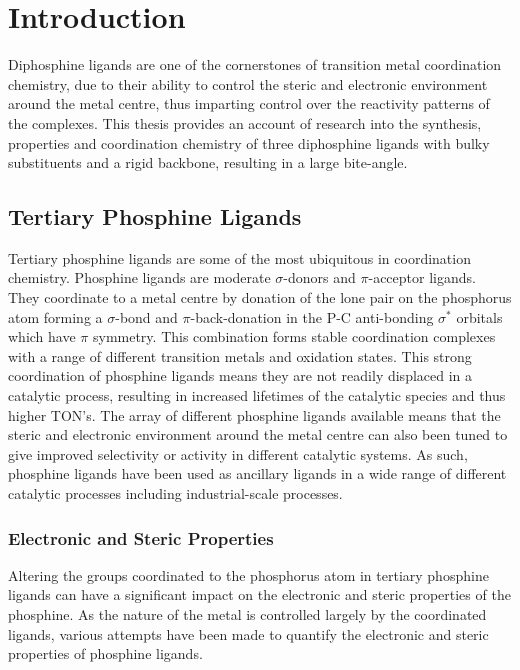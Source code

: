 
\chapter{Introduction}
\label{chapter:introduction}

Diphosphine ligands are one of the cornerstones of transition metal coordination chemistry, due to their ability to control the steric and electronic environment around the metal centre, thus imparting control over the reactivity patterns of the complexes.  This thesis provides an account of research into the synthesis, properties and coordination chemistry of three diphosphine ligands with bulky \tBu{} substituents and a rigid backbone, resulting in a large bite-angle.  

\section{Tertiary Phosphine Ligands}

Tertiary phosphine ligands are some of the most ubiquitous in coordination chemistry.  Phosphine ligands are moderate $\sigma$-donors and $\pi$-acceptor ligands.  They coordinate to a metal centre by donation of the lone pair on the phosphorus atom forming a $\sigma$-bond and $\pi$-back-donation in the P-C anti-bonding $\sigma^*$ orbitals which have $\pi$ symmetry.\cite{Orpen1990}  This combination forms stable coordination complexes with a range of different transition metals and oxidation states.  This strong coordination of phosphine ligands means they are not readily displaced in a catalytic process, resulting in increased lifetimes of the catalytic species and thus higher \gls{TON}'s.  The array of different phosphine ligands available means that the steric and electronic environment around the metal centre can also been tuned to give improved selectivity or activity in different catalytic systems.  As such, phosphine ligands have been used as ancillary ligands in a wide range of different catalytic processes including industrial-scale processes.  

\subsection{Electronic and Steric Properties}

Altering the groups coordinated to the phosphorus atom in tertiary phosphine ligands can have a significant impact on the electronic and steric properties of the phosphine.  As the nature of the metal is controlled largely by the coordinated ligands, various attempts have been made to quantify the electronic and steric properties of phosphine ligands.  

